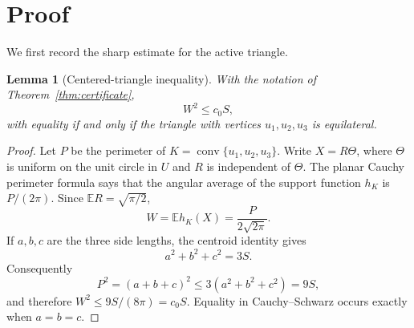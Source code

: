 \documentclass[11pt]{article}
\newtheorem{lemma}[theorem]{Lemma}
\newcommand{\E}{\mathbb E}
\begin{document}
\section*{Proof}

We first record the sharp estimate for the active triangle.

\begin{lemma}[Centered-triangle inequality]\label{lem:triangle}
With the notation of Theorem~\ref{thm:certificate},
\[
 W^2\le c_0S,
\]
with equality if and only if the triangle with vertices $u_1,u_2,u_3$ is
equilateral.
\end{lemma}

\begin{proof}
Let $P$ be the perimeter of $K=\operatorname{conv}\{u_1,u_2,u_3\}$.
Write $X=R\Theta$, where $\Theta$ is uniform on the unit circle in $U$ and
$R$ is independent of $\Theta$. The planar Cauchy perimeter formula says
that the angular average of the support function $h_K$ is $P/(2\pi)$.
Since $\E R=\sqrt{\pi/2}$,
\[
 W=\E h_K(X)=\frac{P}{2\sqrt{2\pi}}.
\]
If $a,b,c$ are the three side lengths, the centroid identity gives
\[
 a^2+b^2+c^2=3S.
\]
Consequently
\[
 P^2=(a+b+c)^2\le3(a^2+b^2+c^2)=9S,
\]
and therefore $W^2\le9S/(8\pi)=c_0S$. Equality in Cauchy--Schwarz occurs
exactly when $a=b=c$.
\end{proof}
\end{document}
